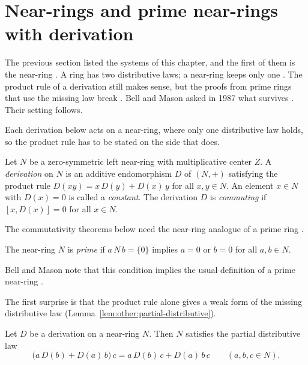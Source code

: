 \section{Near-rings and prime near-rings with derivation}\label{sec:other-systems:near-rings}

The previous section listed the systems of this chapter, and the first of
them is the near-ring \cite[p.~31]{BellMason1987}. A ring has two
distributive laws; a near-ring keeps only one
\cite[p.~31]{BellMason1987}. The product rule of a derivation still makes
sense, but the proofs from prime rings that use the missing law break
\cite[p.~31]{BellMason1987}. Bell and Mason asked in 1987
what survives \cite[p.~31]{BellMason1987}. Their setting follows.

Each derivation below acts on a near-ring, where only one distributive law holds, so the product rule has to be stated on the side that does.

\begin{definition}\label{def:other:near-ring-derivation}
Let $N$ be a zero-symmetric left near-ring with multiplicative center $Z$.
A \emph{derivation} on $N$ is an additive endomorphism $D$ of $(N, +)$
satisfying the product rule $D(xy) = x\,D(y) + D(x)\,y$ for all $x, y \in N$.
An element $x \in N$ with $D(x) = 0$ is called a \emph{constant}. The
derivation $D$ is \emph{commuting} if $[x, D(x)] = 0$ for all $x \in N$.
\end{definition}

The commutativity theorems below need the near-ring analogue of a prime
ring \cite[p.~31]{BellMason1987}.

\begin{definition}\label{def:other:prime-near-ring}
The near-ring $N$ is \emph{prime} if $a\,N\,b = \{0\}$ implies $a = 0$ or
$b = 0$ for all $a, b \in N$.
\end{definition}

Bell and Mason note that this condition implies the usual definition of a
prime near-ring \cite[p.~31]{BellMason1987}.

The first surprise is that the product rule alone gives a weak form of the
missing distributive law (Lemma~\ref{lem:other:partial-distributive}).

\begin{lemma}\label{lem:other:partial-distributive}
Let $D$ be a derivation on a near-ring $N$. Then $N$ satisfies the partial
distributive law
\[
\bigl(a\,D(b) + D(a)\,b\bigr)\,c = a\,D(b)\,c + D(a)\,b\,c
\qquad (a, b, c \in N).
\]
\end{lemma}

